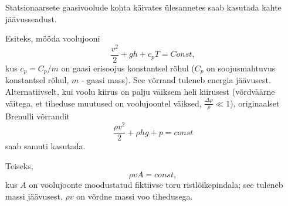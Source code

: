 \documentclass[a4paper,11pt,twocolumn]{article}
\begin{document}
Statsionaarsete gaasivoolude kohta käivates ülesannetes saab kasutada kahte jäävusseadust. 

Esiteks, mööda voolujooni
\[ \frac{v^2}{2}+gh+c_pT=Const, \]
kus \( c_p=C_p/m \) on gaasi erisoojus konstantsel rõhul (\( C_p \) on soojusmahtuvus konstantsel rõhul, \( m \) - gaasi mass). See võrrand tuleneb energia jäävusest. Alternatiivselt, kui voolu kiirus on palju väiksem heli kiirusest (võrdväärne väitega, et tiheduse muutused on voolujoontel väiksed, \( \frac{\Delta \rho}{\rho}\ll 1 \)), originaalset Brenulli võrrandit
\[ \frac{\rho v^2}{2}+\rho hg+p=const \]
saab samuti kasutada.

Teiseks,
\[ \rho v A=const ,\]
kus \( A \) on voolujoonte moodustatud fiktiivse toru ristlõikepindala; see tuleneb massi jäävusest, \( \rho v \) on võrdne massi voo tihedusega.
\end{document}
